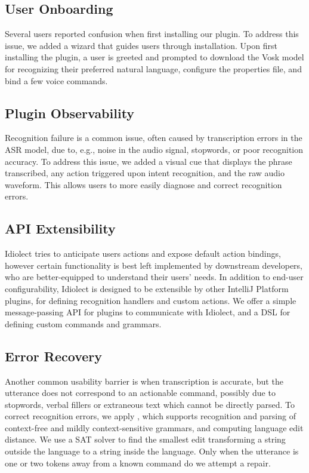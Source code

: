 \documentclass{article}
\theoremstyle{plain}
\theoremstyle{definition}
\theoremstyle{remark}
\begin{document}
\subsection{User Onboarding}

Several users reported confusion when first installing our plugin. To address this issue, we added a wizard that guides users through installation. Upon first installing the plugin, a user is greeted and prompted to download the Vosk model for recognizing their preferred natural language, configure the properties file, and bind a few voice commands.

\subsection{Plugin Observability}

Recognition failure is a common issue, often caused by transcription errors in the ASR model, due to, e.g., noise in the audio signal, stopwords, or poor recognition accuracy. To address this issue, we added a visual cue that displays the phrase transcribed, any action triggered upon intent recognition, and the raw audio waveform. This allows users to more easily diagnose and correct recognition errors.

\subsection{API Extensibility}

Idiolect tries to anticipate users actions and expose default action bindings, however certain functionality is best left implemented by downstream developers, who are better-equipped to understand their users' needs. In addition to end-user configurability, Idiolect is designed to be extensible by other IntelliJ Platform plugins, for defining recognition handlers and custom actions. We offer a simple message-passing API for plugins to communicate with Idiolect, and a DSL for defining custom commands and grammars.

\subsection{Error Recovery}\label{sec:error}

Another common usability barrier is when transcription is accurate, but the utterance does not correspond to an actionable command, possibly due to stopwords, verbal fillers or extraneous text which cannot be directly parsed. To correct recognition errors, we apply \citet{considine2022tidyparse}, which supports recognition and parsing of context-free and mildly context-sensitive grammars, and computing language edit distance. We use a SAT solver to find the smallest edit transforming a string outside the language to a string inside the language. Only when the utterance is one or two tokens away from a known command do we attempt a repair.
\end{document}
